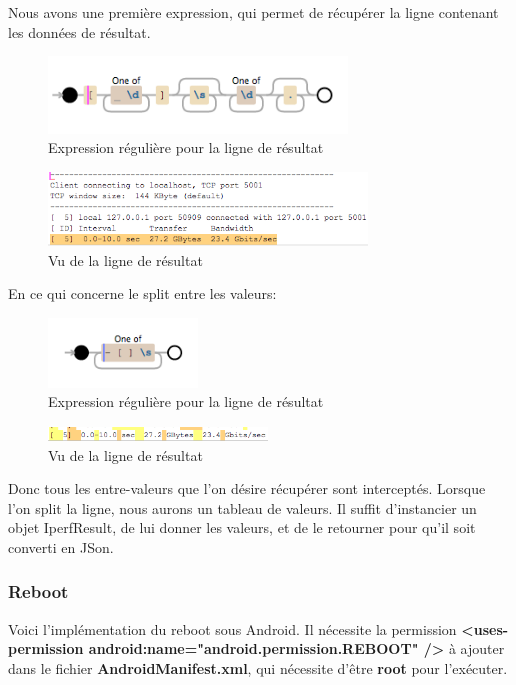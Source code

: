 Nous avons une première expression, qui permet de récupérer la ligne contenant les données de résultat.
\begin{figure}[H]
      \centering
      \includegraphics[width=300px]{00_media/regex_line_match_sch}
      \caption{Expression régulière pour la ligne de résultat}
      \label{gra:maqmenu}
\end{figure}
 
\begin{figure}[H]
      \centering
      \includegraphics[width=320px]{00_media/regex_line_match}
      \caption{Vu de la ligne de résultat}
      \label{gra:maqmenu}
\end{figure}

En ce qui concerne le split entre les valeurs:
\begin{figure}[H]
      \centering
      \includegraphics[width=150px]{00_media/regex_between_value_sch}
      \caption{Expression régulière pour la ligne de résultat}
      \label{gra:maqmenu}
\end{figure}
 
\begin{figure}[H]
      \centering
      \includegraphics[width=220px]{00_media/regex_between_value}
      \caption{Vu de la ligne de résultat}
      \label{gra:maqmenu}
\end{figure}

Donc tous les entre-valeurs que l'on désire récupérer sont interceptés. Lorsque l'on split la ligne, nous aurons un tableau de valeurs. Il suffit d'instancier un objet IperfResult, de lui donner les valeurs, et de le retourner pour qu'il soit converti en JSon.

\subsubsection{Reboot}
Voici l'implémentation du reboot sous Android. Il nécessite la permission \textbf{<uses-permission android:name="android.permission.REBOOT" />} à ajouter dans le fichier \textbf{AndroidManifest.xml}, qui nécessite d'être \textbf{root} pour l'exécuter.

